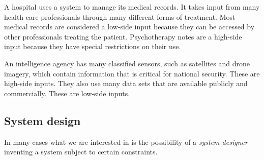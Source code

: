 \documentclass[../thesis.tex]{subfiles}
\begin{document}
\begin{exm}
  A hospital uses a system to manage its medical records.
  It takes input from many health care professionals through
  many different forms of treatment.
  Most medical records are considered a low-side input
  because they can be accessed by other professionals
  treating the patient.
  Psychotherapy notes are a high-side input because they
  have special restrictions on their use.
\end{exm}

\begin{exm}
  An intelligence agency has many classified sensors,
  such as satellites and drone imagery, which contain information
  that is critical for national security.
  These are high-side inputs.
  They also use many data sets that are available publicly
  and commercially.
  These are low-side inputs.
\end{exm}

\subsection{System design}
\label{sec:design}

In many cases what we are interested in is the possibility
of a \emph{system designer} inventing a system subject
to certain constraints.

%
%
%
%
%
%
\end{document}
